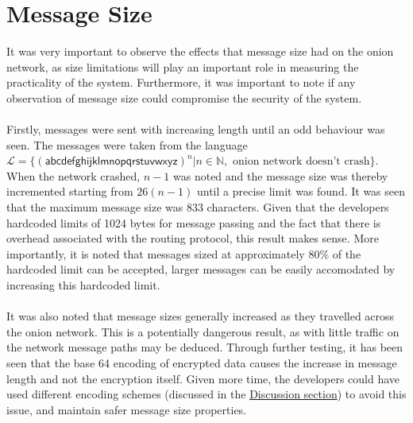 \documentclass[10pt]{report}
\begin{document}
\section{Message Size}
It was very important to observe the effects that message size had on the onion network, as size
limitations will play an important role in measuring the practicality of the system. Furthermore, it
was important to note if any observation of message size could compromise the security of the
system.\\\\
Firstly, messages were sent with increasing length until an odd behaviour was seen. The messages
were taken from the language $\mathcal{L} = \{(\mathsf{abcdefghijklmnopqrstuvwxyz})^n |
n\in\mathbb{N}, \text{ onion network doesn't crash}\}$. When the network crashed, $n-1$ was noted and
the message size was thereby incremented starting from $26(n-1)$ until a precise limit was found. It
was seen that the maximum message size was 833 characters. Given that the developers hardcoded
limits of 1024 bytes for message passing and the fact that there is overhead associated with the
routing protocol, this result makes sense. More importantly, it is noted that messages sized at
approximately 80\% of the hardcoded limit can be accepted, larger messages can be easily accomodated
by increasing this hardcoded limit.\\\\
It was also noted that message sizes generally increased as they travelled across the onion network.
This is a potentially dangerous result, as with little traffic on the network message paths may be
deduced. Through further testing, it has been seen that the base 64 encoding of encrypted data
causes the increase in message length and not the encryption itself. Given more time, the developers
could have used different encoding schemes (discussed in the \hyperref[discussion]{Discussion
section}) to avoid this issue, and maintain safer message size properties.
\end{document}
